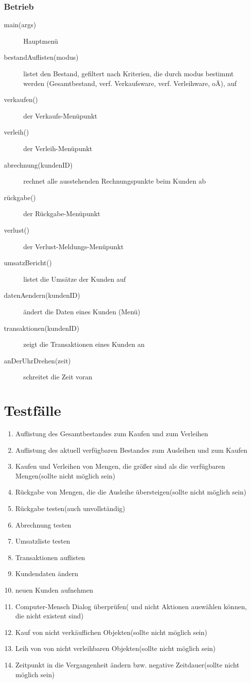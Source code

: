 \documentclass[a4paper,12pt,titlepage]{article}
\begin{document}
\section{Betrieb}
\begin{description}
\item[main(args)]
Hauptmenü
\item[bestandAuflisten(modus)]
listet den Bestand, gefiltert nach Kriterien, die durch modus bestimmt werden (Gesamtbestand, verf. Verkaufsware, verf. Verleihware, oÄ), auf
\item[verkaufen()]
der Verkaufs-Menüpunkt
\item[verleih()]
der Verleih-Menüpunkt
\item[abrechnung(kundenID)]
rechnet alle ausstehenden Rechnungspunkte beim Kunden ab
\item[rückgabe()]
der Rückgabe-Menüpunkt
\item[verlust()]
der Verlust-Meldungs-Menüpunkt
\item[umsatzBericht()]
listet die Umsätze der Kunden auf
\item[datenAendern(kundenID)]
ändert die Daten eines Kunden (Menü)
\item[transaktionen(kundenID)]
zeigt die Transaktionen eines Kunden an
\item[anDerUhrDrehen(zeit)]
schreitet die Zeit voran
\end{description}
\part{Testfälle}
\begin{enumerate}
\item
Auflistung des Gesamtbestandes zum Kaufen und zum Verleihen 
\item
Auflistung des aktuell verfügbaren Bestandes zum Ausleihen und zum Kaufen
\item
Kaufen und Verleihen von Mengen, die größer sind als die verfügbaren Mengen(sollte nicht möglich sein)
\item
Rückgabe von Mengen, die die Ausleihe übersteigen(sollte nicht möglich sein)
\item
Rückgabe testen(auch unvollständig)
\item
Abrechnung testen
\item
Umsatzliste testen
\item
Transaktionen auflisten
\item
Kundendaten ändern 
\item
neuen Kunden aufnehmen
\item
Computer-Mensch Dialog überprüfen( und nicht Aktionen auswählen können, die nicht existent sind)
\item
Kauf von nicht verkäuflichen Objekten(sollte nicht möglich sein)
\item
Leih von von nicht verleihbaren Objekten(sollte nicht möglich sein)
\item
Zeitpunkt in die Vergangenheit ändern bzw. negative Zeitdauer(sollte nicht möglich sein)

\end{enumerate}
\appendix
\newpage
\end{document}
